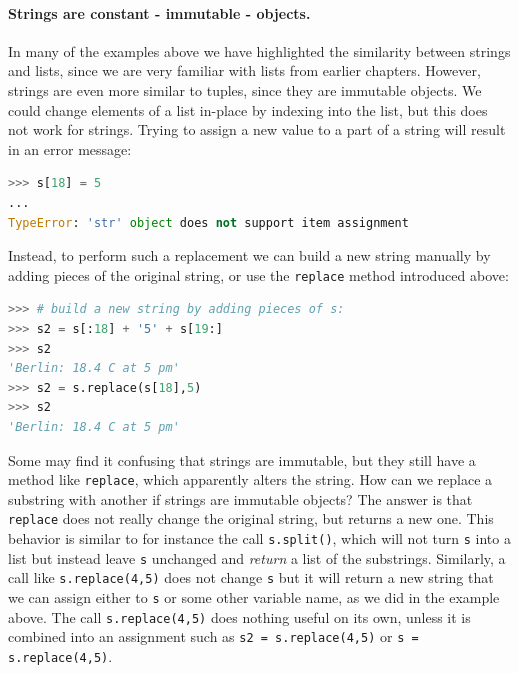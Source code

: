 \documentclass[graybox,envcountchap,sectrefs,final]{svmonodo}
\begin{document}
\paragraph{Strings are constant - immutable - objects.}
In many of the examples above we have highlighted the similarity between strings and lists, since we are
very familiar with lists from earlier chapters. However, strings are even more similar to tuples, since they are
immutable objects. We could change elements of a list in-place by indexing into the list, but this does not
work for strings. Trying to assign a new value to a part of a string will result in an error message:
\begin{lstlisting}[language=Python,style=blue1]
>>> s[18] = 5
...
TypeError: 'str' object does not support item assignment
\end{lstlisting}
Instead, to perform such a replacement we can build a new string manually by adding pieces of the original string,
or use the \texttt{replace} method introduced above:
\begin{lstlisting}[language=Python,style=blue1]
>>> # build a new string by adding pieces of s:
>>> s2 = s[:18] + '5' + s[19:]
>>> s2
'Berlin: 18.4 C at 5 pm'
>>> s2 = s.replace(s[18],5)
>>> s2
'Berlin: 18.4 C at 5 pm'
\end{lstlisting}
Some may find it confusing that strings are immutable, but they still have a method like \texttt{replace}, which apparently
alters the string. How can we replace a substring with another if strings are immutable objects?
The answer is that \texttt{replace} does not really change the original string, but returns
a new one. This behavior is similar to for instance the call \texttt{s.split()}, which will not turn \texttt{s} into a list but
instead leave \texttt{s} unchanged and \emph{return} a list of the substrings. Similarly, a call like \texttt{s.replace(4,5)} does
not change \texttt{s} but it will return a new string that we can assign either to \texttt{s} or some other variable name,
as we did in the example above. The call \texttt{s.replace(4,5)} does nothing useful on its own, unless it is combined
into an assignment such as \texttt{s2 = s.replace(4,5)} or \texttt{s = s.replace(4,5)}.
\end{document}
